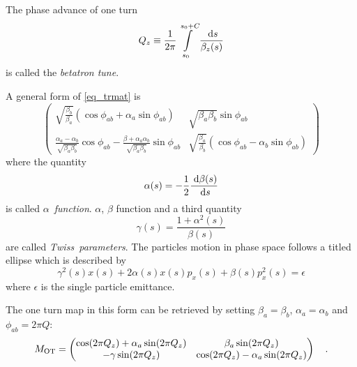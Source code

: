 The phase advance of one turn
%
\begin{equation}
    Q_z \equiv \frac{1}{2\pi}\int\limits_{s_0}^{s_0+C} \frac{\;\text{d} s}{\beta_z(s)}
\end{equation}
%
is called the \emph{betatron tune}.

A general form of \eqref{eq_trmat} is 
%
\begin{equation}
    \begin{pmatrix}
        \sqrt{\frac{\beta_b}{\beta_a}}(\cos\phi_{ab} + \alpha_a \sin\phi_{ab}) &
        \sqrt{\beta_a\beta_b} \sin\phi_{ab} \\
        \frac{\alpha_a - \alpha_b}{\sqrt{\beta_a\beta_b}}\cos\phi_{ab} - \frac{\beta+\alpha_a\alpha_b}{\sqrt{\beta_a\beta_b}}\sin\phi_{ab} &
        \sqrt{\frac{\beta_a}{\beta_b}}(\cos\phi_{ab} - \alpha_b\sin\phi_{ab})
    \end{pmatrix}
    \label{eq_trmat_01}
\end{equation}
%
where the quantity
%
\begin{equation}
    \alpha(s) = -\frac{1}{2}\frac{\;\text{d} \beta(s)}{ \;\text{d} s}
    \label{eq_alpha}
\end{equation}
%
is called $\alpha$~\emph{function}.
%
$\alpha$, $\beta$ function and a third quantity
%
\begin{equation}
    \gamma(s) = \frac{1+\alpha^2(s)}{\beta(s)}
\end{equation}
%
are called \emph{Twiss~parameters}. The particles motion in phase space follows a titled ellipse which is described by
%
\begin{equation}
    \gamma^2(s)x(s) + 2\alpha(s)x(s)p_x(s) + \beta(s)p_x^2(s) = \epsilon
\end{equation}
%
where $\epsilon$ is the single particle emittance.

The one turn map in this form can be retrieved by setting $\beta_a = \beta_b $, ${\alpha_a = \alpha_b}$
and ${\phi_{ab} = 2\pi Q}$:
%
\begin{equation}
    M_\text{OT} = \begin{pmatrix}
        \cos(2\pi Q_z) + \alpha_a \sin(2\pi Q_z) & \beta_a\sin(2\pi Q_z) \\
        -\gamma\sin(2\pi Q_z) & \cos(2\pi Q_z) - \alpha_a\sin(2\pi Q_z)
    \end{pmatrix}
    \quad .
\end{equation}
%
